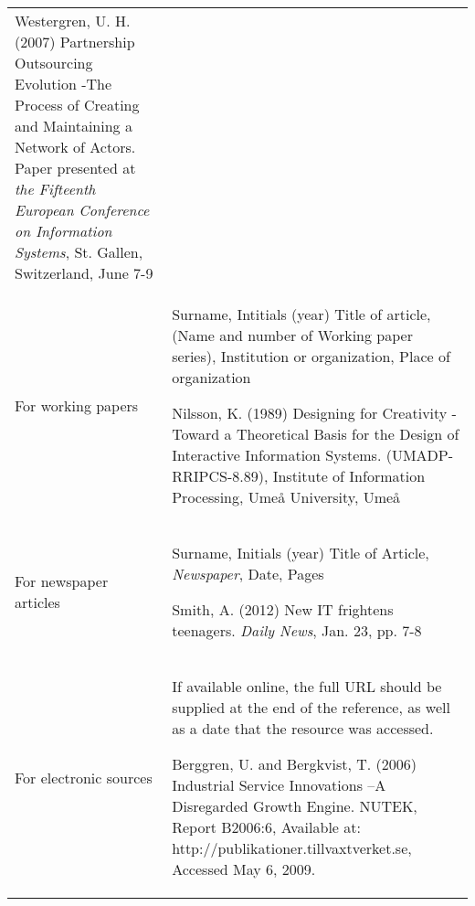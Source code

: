 \documentclass[]{article}
\begin{document}
\begin{longtable}[]{@{}
  >{\raggedright\arraybackslash}p{}
  >{\raggedright\arraybackslash}p{}@{}}
Westergren, U. H. (2007) Partnership Outsourcing Evolution -The Process
of Creating and Maintaining a Network of Actors. Paper presented at
\emph{the Fifteenth European Conference on Information Systems}, St.
Gallen, Switzerland, June 7-9 \\
For working papers & Surname, Intitials (year) Title of article, (Name
and number of Working paper series), Institution or organization, Place
of organization

Nilsson, K. (1989) Designing for Creativity - Toward a Theoretical Basis
for the Design of Interactive Information Systems. (UMADP-RRIPCS-8.89),
Institute of Information Processing, Umeå University, Umeå \\
For newspaper articles & Surname, Initials (year) Title of Article,
\emph{Newspaper}, Date, Pages

Smith, A. (2012) New IT frightens teenagers. \emph{Daily News}, Jan. 23,
pp. 7-8 \\
For electronic sources & If available online, the full URL should be
supplied at the end of the reference, as well as a date that the
resource was accessed.

Berggren, U. and Bergkvist, T. (2006) Industrial Service Innovations --A
Disregarded Growth Engine. NUTEK, Report B2006:6, Available at:
http://publikationer.tillvaxtverket.se, Accessed May 6, 2009. \\
\end{longtable}
\end{document}
